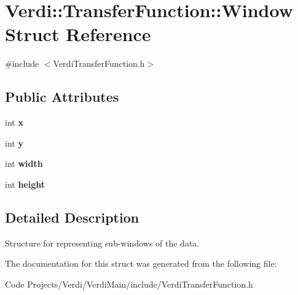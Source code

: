 \hypertarget{struct_verdi_1_1_transfer_function_1_1_window}{\section{\-Verdi\-:\-:\-Transfer\-Function\-:\-:\-Window \-Struct \-Reference}
\label{struct_verdi_1_1_transfer_function_1_1_window}
}


{\ttfamily \#include $<$\-Verdi\-Transfer\-Function.\-h$>$}

\subsection*{\-Public \-Attributes}
\begin{DoxyCompactItemize}
\item 
\hypertarget{struct_verdi_1_1_transfer_function_1_1_window_a488b7931d413df49ce2814fc8261b6fa}{int {\bfseries x}}\label{struct_verdi_1_1_transfer_function_1_1_window_a488b7931d413df49ce2814fc8261b6fa}

\item 
\hypertarget{struct_verdi_1_1_transfer_function_1_1_window_aec866bb733c28de80d4803b8c52aec37}{int {\bfseries y}}\label{struct_verdi_1_1_transfer_function_1_1_window_aec866bb733c28de80d4803b8c52aec37}

\item 
\hypertarget{struct_verdi_1_1_transfer_function_1_1_window_a6d330cfd730678a14e7ea9e6217f04a7}{int {\bfseries width}}\label{struct_verdi_1_1_transfer_function_1_1_window_a6d330cfd730678a14e7ea9e6217f04a7}

\item 
\hypertarget{struct_verdi_1_1_transfer_function_1_1_window_a9b0f5d14e2576db6e8d52e251f1541ef}{int {\bfseries height}}\label{struct_verdi_1_1_transfer_function_1_1_window_a9b0f5d14e2576db6e8d52e251f1541ef}

\end{DoxyCompactItemize}


\subsection{\-Detailed \-Description}
\-Structure for representing sub-\/windows of the data. 

\-The documentation for this struct was generated from the following file\-:\begin{DoxyCompactItemize}
\item 
\-Code Projects/\-Verdi/\-Verdi\-Main/include/\-Verdi\-Transfer\-Function.\-h\end{DoxyCompactItemize}
